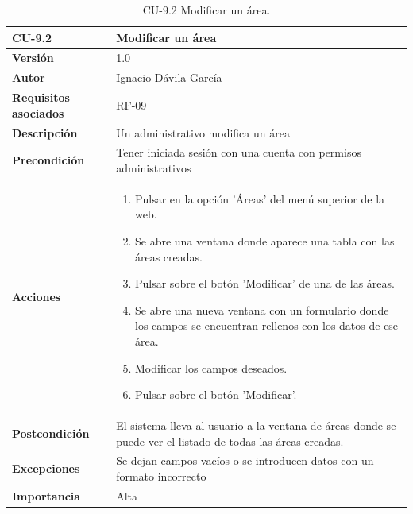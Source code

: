\begin{table}[p]
	\centering
	\begin{tabularx}{\linewidth}{ p{} p{} }
		\toprule
		\textbf{CU-9.2}    & \textbf{Modificar un área}\\
		\toprule
		\textbf{Versión}              & 1.0    \\
		\textbf{Autor}                & Ignacio Dávila García \\
		\textbf{Requisitos asociados} & RF-09 \\
		\textbf{Descripción}          & Un administrativo modifica un área \\
		\textbf{Precondición}         & Tener iniciada sesión con una cuenta con permisos administrativos \\
		\textbf{Acciones}             &
		\begin{enumerate}
			\def\labelenumi{\arabic{enumi}.}
			\tightlist
			\item Pulsar en la opción 'Áreas' del menú superior de la web.
			\item Se abre una ventana donde aparece una tabla con las áreas creadas.
			\item Pulsar sobre el botón 'Modificar' de una de las áreas.
			\item Se abre una nueva ventana con un formulario donde los campos se encuentran rellenos con los datos de ese área.
			\item Modificar los campos deseados.
			\item Pulsar sobre el botón 'Modificar'.
		\end{enumerate}\\
		\textbf{Postcondición}        & El sistema lleva al usuario a la ventana de áreas donde se puede ver el listado de todas las áreas creadas. \\
		\textbf{Excepciones}          & Se dejan campos vacíos o se introducen datos con un formato incorrecto \\
		\textbf{Importancia}          & Alta \\
		\bottomrule
	\end{tabularx}
	\caption{CU-9.2 Modificar un área.}
\end{table}

